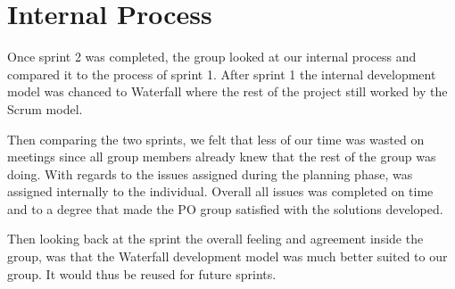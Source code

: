 \section{Internal Process}
Once sprint 2 was completed, the group looked at our internal process and compared it to the process of sprint 1. 
After sprint 1 the internal development model was chanced to Waterfall where the rest of the project still worked by the Scrum model.

Then comparing the two sprints, we felt that less of our time was wasted on meetings since all group members already knew that the rest of the group was doing. 
With regards to the issues assigned during the planning phase, was assigned internally to the individual. 
Overall all issues was completed on time and to a degree that made the PO group satisfied with the solutions developed. 

Then looking back at the sprint the overall feeling and agreement inside the group, was that the Waterfall development model was much better suited to our group. 
It would thus be reused for future sprints.